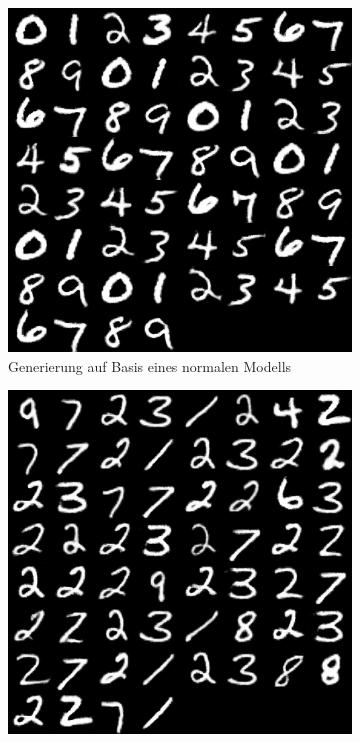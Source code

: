 \begin{figure}[H]
	\centering
	\begin{subfigure}[b]{0.35\linewidth}
		\includegraphics[width=\linewidth]{Bilder/mnist_kedmi.png}
		\caption{Generierung auf Basis eines normalen Modells}
		\label{img:kedmi_mnist}
	\end{subfigure}
	\hspace{1cm} %
	\begin{subfigure}[b]{0.35\linewidth}
		\includegraphics[width=\linewidth]{Bilder/mnist_kedmi_dp.png}

\end{subfigure}
\end{figure}
